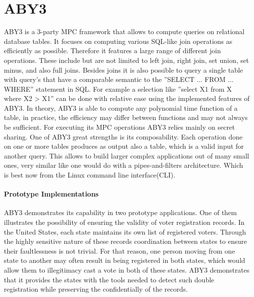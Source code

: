 \section{ABY3}
ABY3 is a 3-party MPC framework that allows to compute queries on relational database tables. It focuses on computing various SQL-like join operations as efficiently as possible. Therefore it features a large range of different join operations. These include but are not limited to left join, right join, set union, set minus, and also full joins.  
Besides joins it is also possible to query a single table with query's that have a comparable semantic to the ''SELECT ... FROM ... WHERE'' statement in SQL. For example a selection like ''select X1 from X  where X2 > X1'' can be done with relative ease using the implemented features of ABY3. In theory, ABY3 is able to compute any polynomial time function of a table, in practice, the efficiency may differ between functions and may not always be sufficient. For executing its MPC operations ABY3 relies mainly on secret sharing. 
One of ABY3 great strengths is its composability. 
Each operation done on one or more tables produces as output also a table, which is a valid input for another query. This allows to build larger complex applications out of many small ones, very similar like one would do with a pipes-and-filters architecture. Which is best now from the Linux command line interface(CLI). 


\paragraph{Prototype Implementations}
ABY3 demonstrates its capability in two prototype applications. One of them illustrates the possibility of ensuring the validity of voter registration records. In the United States, each state maintains its own list of registered voters. Through the highly sensitive nature of these records coordination between states to ensure their faultlessness is not trivial. For that reason, one person moving from one state to another may often result in being registered in both states, which would allow them to illegitimacy cast a vote in both of these states.
ABY3 demonstrates that it provides the states with  the tools needed to detect such double registration while preserving the confidentially of the records. 

